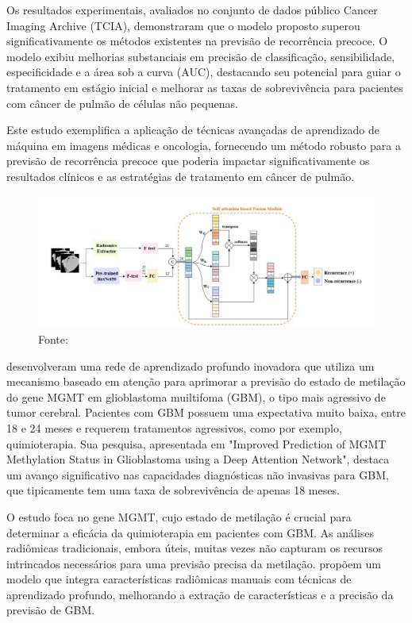 Os resultados experimentais, avaliados no conjunto de dados público Cancer Imaging Archive (TCIA), demonstraram que o modelo proposto superou significativamente os métodos existentes na previsão de recorrência precoce. O modelo exibiu melhorias substanciais em precisão de classificação, sensibilidade, especificidade e a área sob a curva (AUC), destacando seu potencial para guiar o tratamento em estágio inicial e melhorar as taxas de sobrevivência para pacientes com câncer de pulmão de células não pequenas.

Este estudo exemplifica a aplicação de técnicas avançadas de aprendizado de máquina em imagens médicas e oncologia, fornecendo um método robusto para a previsão de recorrência precoce que poderia impactar significativamente os resultados clínicos e as estratégias de tratamento em câncer de pulmão.

\begin{figure}[htbp]
    \centering
    \includegraphics[width=1\textwidth]{figures/fig008.png}
    \caption{Fonte: \cite{aiSelfAttentionBasedFusion2023}}
    \label{fig:fig008}
\end{figure}

\cite{iranmehrImprovedPredictionMGMT2022} desenvolveram uma rede de aprendizado profundo inovadora que utiliza um mecanismo baseado em atenção para aprimorar a previsão do estado de metilação do gene MGMT em glioblastoma muiltifoma (GBM), o tipo mais agressivo de tumor cerebral. Pacientes com GBM possuem uma expectativa muito baixa, entre 18 e 24 meses e requerem tratamentos agressivos, como por exemplo, quimioterapia. Sua pesquisa, apresentada em "Improved Prediction of MGMT Methylation Status in Glioblastoma using a Deep Attention Network", destaca um avanço significativo nas capacidades diagnósticas não invasivas para GBM, que tipicamente tem uma taxa de sobrevivência de apenas 18 meses.

O estudo foca no gene MGMT, cujo estado de metilação é crucial para determinar a eficácia da quimioterapia em pacientes com GBM. As análises radiômicas tradicionais, embora úteis, muitas vezes não capturam os recursos intrincados necessários para uma previsão precisa da metilação. \citeauthor{iranmehrImprovedPredictionMGMT2022} propõem um modelo que integra características radiômicas manuais com técnicas de aprendizado profundo, melhorando a extração de características e a precisão da previsão de GBM.

